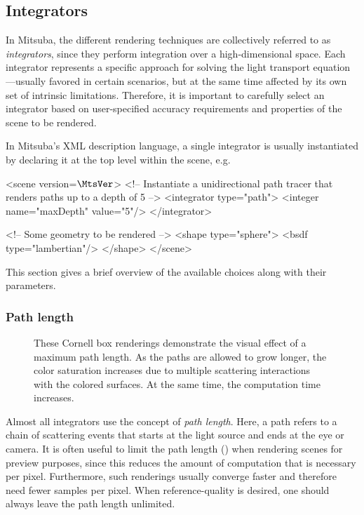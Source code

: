 \newpage
\subsection{Integrators}
\label{sec:integrators}
In Mitsuba, the different rendering techniques are collectively referred to as 
\emph{integrators}, since they perform integration over a high-dimensional
space. Each integrator represents a specific approach for solving
the light transport equation---usually favored in certain scenarios, but
at the same time affected by its own set of intrinsic limitations.
Therefore, it is important to carefully select an integrator based on 
user-specified accuracy requirements and properties of the scene to be 
rendered. 

In Mitsuba's XML description language, a single integrator
is usually instantiated by declaring it at the top level within the
scene, e.g.
\begin{xml}
<scene version=$\MtsVer$>
	<!-- Instantiate a unidirectional path tracer that
	     renders paths up to a depth of 5 -->
	<integrator type="path">
		<integer name="maxDepth" value="5"/>
	</integrator>

	<!-- Some geometry to be rendered -->
	<shape type="sphere">
		<bsdf type="lambertian"/>
	</shape>
</scene>
\end{xml}

This section gives a brief overview of the available choices 
along with their parameters.

\subsubsection*{Path length}
\begin{figure}[htb!]
\centering
\hfill
{}
\caption{
	\label{fig:pathlengths}
	These Cornell box renderings demonstrate the visual 
	effect of a maximum path length. As the paths
	are allowed to grow longer, the color saturation
	increases due to multiple scattering interactions
	with the colored surfaces. At the same time, the
	computation time increases.
}
\end{figure}

Almost all integrators use the concept of \emph{path length}.
Here, a path refers to a chain of scattering events that 
starts at the light source and ends at the eye or camera.
It is often useful to limit the path length () 
when rendering scenes for preview purposes, since this reduces the amount 
of computation that is necessary per pixel. Furthermore, such renderings
usually converge faster and therefore need fewer samples per pixel.
When reference-quality is desired, one should always leave the path 
length unlimited.

